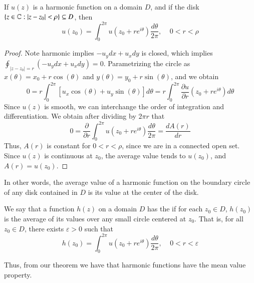 \begin{theorem}
    If $u(z)$ is a harmonic function on a domain $D$, and if the disk $\{z \in \mathbb C:|z-z_0| < \rho\} \subseteq D$, then \begin{equation*}
        u(z_0) = \int_0^{2\pi}u(z_0+re^{i\theta})\frac{d\theta}{2\pi}, \;\;\;\; 0 < r < \rho
    \end{equation*}
\end{theorem}
\begin{proof}
    Note harmonic implies $-u_ydx+u_xdy$ is closed, which implies $\oint_{|z-z_0| = r}(-u_ydx+u_xdy) = 0$. Parametrizing the circle as $x(\theta) = x_0+r\cos(\theta)$ and $y(\theta) = y_0+r\sin(\theta)$, and we obtain \begin{equation*}
        0 = r\int_{0}^{2\pi}\left[u_x\cos(\theta)+u_y\sin(\theta)\right]d\theta = r\int_0^{2\pi}\frac{\partial u}{\partial r}(z_0+re^{i\theta})d\theta
    \end{equation*}
    Since $u(z)$ is smooth, we can interchange the order of integration and differentiation. We obtain after dividing by $2\pi r$ that \begin{equation*}
        0 = \frac{\partial}{\partial r}\int_0^{2\pi}u(z_0+re^{i\theta})\frac{d\theta}{2\pi} = \frac{dA(r)}{dr}
    \end{equation*}
    Thus, $A(r)$ is constant for $0 < r < \rho$, since we are in a connected open set. Since $u(z)$ is continuous at $z_0$, the average value tends to $u(z_0)$, and $A(r) = u(z_0)$.
\end{proof}


In other words, the average value of a harmonic function on the boundary circle of any disk contained in $D$ is its value at the center of the disk.


\begin{definition}
    We say that a function $h(z)$ on a domain $D$ has the  if for each $z_0 \in D$, $h(z_0)$ is the average of its values over any small circle centered at $z_0$. That is, for all $z_0 \in D$, there exists $\varepsilon > 0$ such that \begin{equation*}
        h(z_0) = \int_0^{2\pi}u(z_0+re^{i\theta})\frac{d\theta}{2\pi},\;\;\;\; 0 < r < \varepsilon
    \end{equation*}
\end{definition}


Thus, from our theorem we have that harmonic functions have the mean value property.



